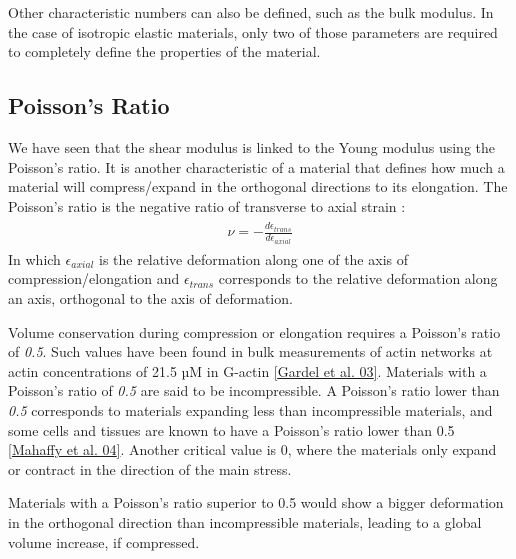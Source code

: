 \documentclass[A4paperpaper,11pt,english]{sphinxmanual}
\begin{document}
Other characteristic numbers can also be defined, such as the bulk modulus. In the case of isotropic
elastic materials, only two of those parameters are required to completely define
the properties of the material.


\subsection{Poisson's Ratio}
\label{parts/part1:poisson-s-ratio}
We have seen that the shear modulus is linked to the Young modulus using
the Poisson's ratio. It is another characteristic of a material
that defines how much a material will compress/expand in the orthogonal directions to its elongation.
The Poisson's ratio is the negative ratio of transverse to axial strain :
\label{parts/part1:equation-eqa10}\begin{gather}
\begin{split}\nu = - \frac{
    d \epsilon_{trans}
}{
    d \epsilon_{axial}
}\end{split}\label{parts/part1-eqa10}
\end{gather}
In which \(\epsilon_{axial}\) is the relative deformation along one of the
axis of compression/elongation and \(\epsilon_{trans}\) corresponds to the
relative deformation along an axis, orthogonal to the axis of deformation.

Volume conservation during compression or elongation requires
a Poisson's ratio of \emph{0.5}. Such values have been found in bulk measurements of
actin networks at actin concentrations of 21.5 µM in G-actin {\hyperref[parts/part1:gardel2003]{{[}Gardel et al. 03{]}}}. Materials with a Poisson's ratio of \emph{0.5} are
said to be incompressible. A Poisson's ratio lower than \emph{0.5} corresponds to materials
expanding less than incompressible materials, and some cells and tissues are known to
have a Poisson's ratio lower than 0.5 {\hyperref[parts/part1:mahaffy2004]{{[}Mahaffy et al. 04{]}}}. Another critical value
is 0, where the materials only expand or contract in the direction of the
main stress.

Materials with a Poisson's ratio superior to 0.5 would show a bigger
deformation in the orthogonal direction than incompressible materials, leading
to a global volume increase, if compressed.
\end{document}
